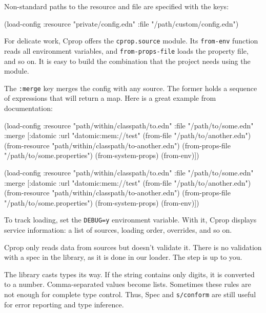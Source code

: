 Non-standard paths to the resource and file are specified with the keys:

\begin{clojure}
(load-config
 :resource "private/config.edn"
 :file "/path/custom/config.edn")
\end{clojure}


For delicate work, Cprop offers the \verb|cprop.source| module. Its \verb|from-env| function reads all environment variables, and \verb|from-props-file| loads the property file, and so on. It is easy to build the combination that the project needs using the module.

The \verb|:merge| key merges the config with any source. The former holds a sequence of expressions that will return a map. Here is a great example from documentation:

\ifnarrow

\begin{clojure}
(load-config
 :resource "path/within/classpath/to.edn"
 :file "/path/to/some.edn"
 :merge
 [{:datomic {:url "datomic:mem://test"}}
  (from-file "/path/to/another.edn")
  (from-resource
  "path/within/classpath/to-another.edn")
  (from-props-file
   "/path/to/some.properties")
  (from-system-props)
  (from-env)])
\end{clojure}

\else

\begin{clojure}
(load-config
 :resource "path/within/classpath/to.edn"
 :file "/path/to/some.edn"
 :merge [{:datomic {:url "datomic:mem://test"}}
         (from-file "/path/to/another.edn")
         (from-resource "path/within/classpath/to-another.edn")
         (from-props-file "/path/to/some.properties")
         (from-system-props)
         (from-env)])
\end{clojure}

\fi

To track loading, set the \verb|DEBUG=y| environment variable. With it, Cprop displays service information: a list of sources, loading order, overrides, and so on.

Cprop only reads data from sources but doesn't validate it. There is no validation with a spec in the library, as it is done in our loader. The step is up to you.

The library casts types its way. If the string contains only digits, it is converted to a number. Comma-separated values become lists. Sometimes these rules are not enough for complete type control. Thus, Spec and \verb|s/conform| are still useful for error reporting and type inference.

